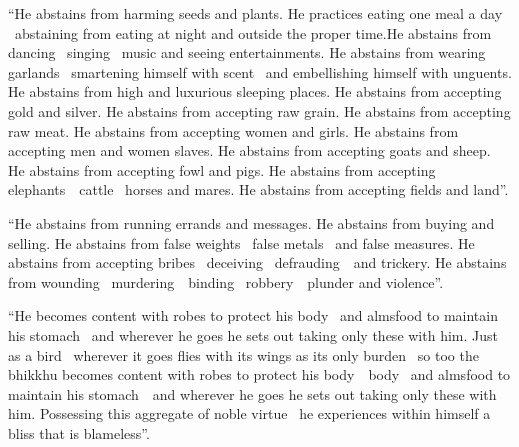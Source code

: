 \begin{english-only-justify}
  ``He abstains from harming seeds and plants. He practices eating one meal a day \breathmark\ abstaining from eating at night and outside the proper time.\makeatletter\hyperlink{endnote148-appendix}\makeatother\thinspace He abstains from dancing \breathmark\ singing \breathmark\ music and seeing entertainments. He abstains from wearing garlands \breathmark\ smartening himself with scent \breathmark\ and embellishing himself with unguents. He abstains from high and luxurious sleeping places. He abstains from accepting gold and silver. He abstains from accepting raw grain. He abstains from accepting raw meat. He abstains from accepting women and girls. He abstains from accepting men and women slaves. He abstains from accepting goats and sheep. He abstains from accepting fowl and pigs. He abstains from accepting \mbox{elephants}~\breathmark\ cattle \breathmark\ horses and mares. He abstains from accepting fields and land''.
\end{english-only-justify}

\begin{english-only-justify}
  ``He abstains from running errands and messages. He abstains from buying and selling. He abstains from false weights \breathmark\ false metals \breathmark\ and false measures. He abstains from accepting bribes \breathmark\ deceiving \breathmark\ \mbox{defrauding}~\breathmark\ and trickery. He abstains from wounding \breathmark\ \mbox{murdering}~\breathmark\ binding \breathmark\ \mbox{robbery}~\breathmark\ plunder and violence''.
\end{english-only-justify}

\begin{english-only-justify}
  ``He becomes content with robes to protect his body \breathmark\ and almsfood to maintain his stomach \breathmark\ and wherever he goes he sets out taking only these with him. Just as a bird \breathmark\ wherever it goes flies with its wings as its only burden \breathmark\ so too the bhikkhu becomes content with robes to protect his \ifafiveversion\mbox{body}~\breathmark\ \else body \breathmark\ \fi and almsfood to maintain his \mbox{stomach}~\breathmark\ and wherever he goes he sets out taking only these with him. Possessing this aggregate of noble virtue \breathmark\ he experiences within himself a bliss that is blameless''.
\end{english-only-justify}

